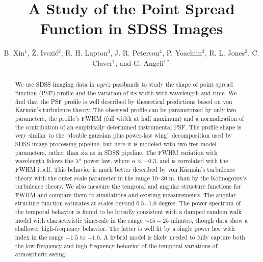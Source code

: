 \documentclass[12pt,preprint]{aastex}
\newcommand{\vk}{von K\'{a}rm\'{a}n}
\begin{document}
\title{A Study of the Point Spread Function in SDSS Images}    %

\author{B. Xin$^1$, \v{Z}. Ivezi\'{c}$^2$, R. H. Lupton$^3$,  J. R. Peterson$^4$, P. Yoachim$^2$, 
R. L. Jones$^2$, C. Claver$^1$, and G. Angeli$^{1*}$}


\begin{abstract}
We use SDSS imaging data in $ugriz$ passbands to study the shape of
point spread function (PSF) profile and the variation of its width with 
wavelength and time. We find that the PSF profile is well described by 
theoretical predictions based on \vk's turbulence theory. The observed 
profile can be parametrized by only two parameters, the profile's FWHM (full width
at half maximum) and a normalization of the contribution of an empirically determined 
instrumental PSF. The profile shape is very similar to the ``double gaussian
plus power-law wing'' decomposition used by SDSS image processing pipeline, 
but here it is modeled with two free model parameters, rather than six as in SDSS pipeline. 
The FWHM variation with wavelength folows the
$\lambda^{\alpha}$ power law, where $\alpha \approx-0.3$, and is correlated
with the FWHM itself. This behavior is much better described by \vk's turbulence 
theory with the outer scale parameter in the range 10--30 m, than by the 
Kolmogorov's turbulence theory. We also measure the temporal and angular
structure functions for FWHM and compare them to simulations and
existing measurements. The angular structure function saturates at scales beyond 0.5$-$1.0 degree. 
The power spectrum of the temporal behavior is found to be broadly consistent with 
a damped random walk model with characteristic timescale in the range $\sim15-25$ minutes, 
though data show a shallower high-frequency behavior. The latter is well fit 
by a single power law with index in the range $-1.5$ to $-1.0$. A hybrid model 
is likely needed to fully capture both the low-frequency and high-frequency 
behavior of the temporal variations of atmospheric seeing. 
\end{abstract}
\end{document}
